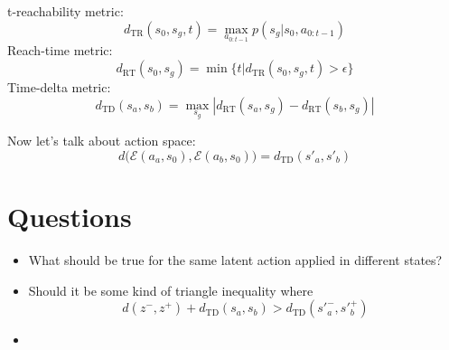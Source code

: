 \documentclass{article}
\begin{document}
t-reachability metric:
\[ d_\text{TR}(s_0, s_g, t) = \max\limits_{a_{0:t-1}}p(s_g|s_0, a_{0:t-1}) \]
Reach-time metric:
\[ d_\text{RT}(s_0, s_g) = \min\{t|d_\text{TR}(s_0,s_g,t)>\epsilon\} \]
Time-delta metric:
\[ d_\text{TD}(s_a, s_b) = \max\limits_{s_g} |d_\text{RT}(s_a,s_g) - d_\text{RT}(s_b,s_g)| \]

Now let's talk about action space:
\[ d\big(\mathcal{E}(a_a, s_0), \mathcal{E}(a_b, s_0)\big) = d_\text{TD}(s'_a, s'_b) \]

\section*{Questions}

\begin{itemize}
  \item What should be true for the same latent action applied in different states?
  \item Should it be some kind of triangle inequality where \[d(z^-,z^+) + d_\text{TD}(s_a, s_b) > d_\text{TD}(s'^-_a, s'^+_b)\]
  \item 
\end{itemize}
\end{document}
